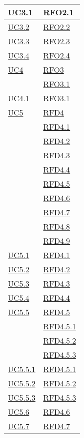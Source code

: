 \begin{longtable}{|>{\centering}m{5cm}|m{5cm}<{\centering}|}
\hyperref[UC3.1]{UC3.1} & \hyperlink{RFO2.1}{RFO2.1}\\ \hline
\hyperref[UC3.2]{UC3.2} & \hyperlink{RFO2.2}{RFO2.2}\\ \hline
\hyperref[UC3.3]{UC3.3} & \hyperlink{RFO2.3}{RFO2.3}\\ \hline
\hyperref[UC3.4]{UC3.4} & \hyperlink{RFO2.4}{RFO2.4}\\ \hline
\hyperref[UC4]{UC4} & \hyperlink{RFO3}{RFO3}\\
& \hyperlink{RFO3.1}{RFO3.1}\\ \hline
\hyperref[UC4.1]{UC4.1} & \hyperlink{RFO3.1}{RFO3.1}\\ \hline
\hyperref[UC5]{UC5} & \hyperlink{RFD4}{RFD4}\\
& \hyperlink{RFD4.1}{RFD4.1}\\
& \hyperlink{RFD4.2}{RFD4.2}\\
& \hyperlink{RFD4.3}{RFD4.3}\\
& \hyperlink{RFD4.4}{RFD4.4}\\
& \hyperlink{RFD4.5}{RFD4.5}\\
& \hyperlink{RFD4.6}{RFD4.6}\\
& \hyperlink{RFD4.7}{RFD4.7}\\
& \hyperlink{RFD4.8}{RFD4.8}\\
& \hyperlink{RFD4.9}{RFD4.9}\\ \hline
\hyperref[UC5.1]{UC5.1} & \hyperlink{RFD4.1}{RFD4.1}\\ \hline
\hyperref[UC5.2]{UC5.2} & \hyperlink{RFD4.2}{RFD4.2}\\ \hline
\hyperref[UC5.3]{UC5.3} & \hyperlink{RFD4.3}{RFD4.3}\\ \hline
\hyperref[UC5.4]{UC5.4} & \hyperlink{RFD4.4}{RFD4.4}\\ \hline
\hyperref[UC5.5]{UC5.5} & \hyperlink{RFD4.5}{RFD4.5}\\
& \hyperlink{RFD4.5.1}{RFD4.5.1}\\
& \hyperlink{RFD4.5.2}{RFD4.5.2}\\
& \hyperlink{RFD4.5.3}{RFD4.5.3}\\ \hline
\hyperref[UC5.5.1]{UC5.5.1} & \hyperlink{RFD4.5.1}{RFD4.5.1}\\ \hline
\hyperref[UC5.5.2]{UC5.5.2} & \hyperlink{RFD4.5.2}{RFD4.5.2}\\ \hline
\hyperref[UC5.5.3]{UC5.5.3} & \hyperlink{RFD4.5.3}{RFD4.5.3}\\ \hline
\hyperref[UC5.6]{UC5.6} & \hyperlink{RFD4.6}{RFD4.6}\\ \hline
\hyperref[UC5.7]{UC5.7} & \hyperlink{RFD4.7}{RFD4.7}\\ \hline

\end{longtable}
